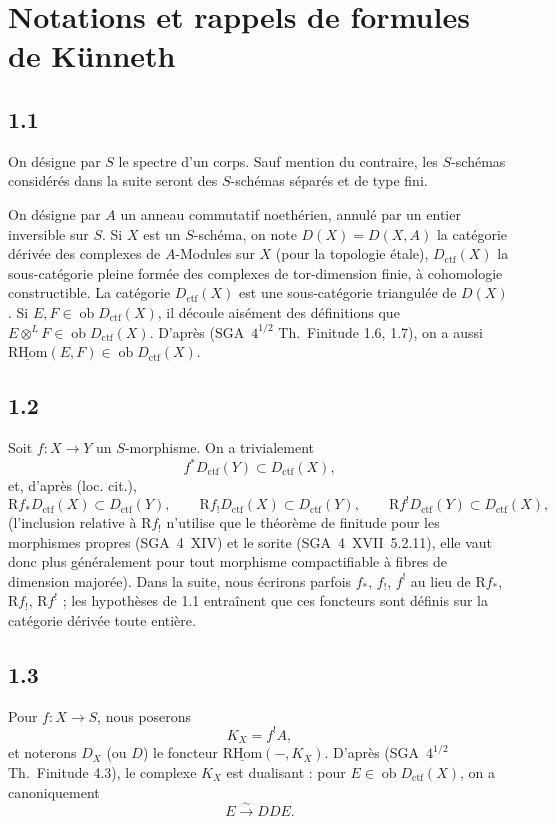 \documentclass[11pt]{article}
\newcommand{\R}{\mathrm{R}}\newcommand{\RHomCore}{\mathrm{RHom}}
\newcommand{\ob}{\operatorname{ob}}
\providecommand{\RHom}{\RHomCore}
\providecommand{\uRHom}{\underline{\RHom}}
\providecommand{\ctf}{\mathrm{ctf}}
\providecommand{\RHom}{\RHomCore}
\providecommand{\ob}{\operatorname{ob}}
\providecommand{\RHom}{\R\mathcal{H}om}
\providecommand{\R}{\mathrm R}
\providecommand{\RHom}{\RHomCore}
\begin{document}
\section{Notations et rappels de formules de Künneth}

\subsection*{1.1}
On désigne par $S$ le spectre d'un corps. Sauf mention du contraire, les $S$-schémas considérés dans la suite seront des $S$-schémas séparés et de type fini.

On désigne par $A$ un anneau commutatif noethérien, annulé par un entier inversible sur $S$. Si $X$ est un $S$-schéma, on note $D(X)=D(X,A)$ la catégorie dérivée des complexes de $A$-Modules sur $X$ (pour la topologie étale), $D_{\ctf}(X)$ la sous-catégorie pleine formée des complexes de tor-dimension finie, à cohomologie constructible. La catégorie $D_{\ctf}(X)$ est une sous-catégorie triangulée de $D(X)$. Si $E,F \in \ob D_{\ctf}(X)$, il découle aisément des définitions que $E \otimes^{L} F \in \ob D_{\ctf}(X)$. D'après (SGA~$4^{1/2}$ Th.~Finitude 1.6, 1.7), on a aussi $\uRHom(E,F) \in \ob D_{\ctf}(X)$.

\subsection*{1.2}
Soit $f:X\to Y$ un $S$-morphisme. On a trivialement
\[
f^{*}D_{\ctf}(Y) \subset D_{\ctf}(X),
\]
et, d'après (loc. cit.),
\[
\R f_{*}D_{\ctf}(X) \subset D_{\ctf}(Y),\qquad
\R f_{!}D_{\ctf}(X) \subset D_{\ctf}(Y),\qquad
\R f^{!}D_{\ctf}(Y) \subset D_{\ctf}(X),
\]
(l'inclusion relative à $\R f_{!}$ n'utilise que le théorème de finitude pour les morphismes propres (SGA~4~XIV) et le sorite (SGA~4~XVII~5.2.11), elle vaut donc plus généralement pour tout morphisme compactifiable à fibres de dimension majorée). Dans la suite, nous écrirons parfois $f_{*}$, $f_{!}$, $f^{!}$ au lieu de $\R f_{*}$, $\R f_{!}$, $\R f^{!}$ ; les hypothèses de 1.1 entraînent que ces foncteurs sont définis sur la catégorie dérivée toute entière.

\subsection*{1.3}
Pour $f:X\to S$, nous poserons
\[
K_X=f^{!}A,
\]
et noterons $D_X$ (ou $D$) le foncteur $\uRHom(-,K_X)$. D'après (SGA~$4^{1/2}$ Th.~Finitude 4.3), le complexe $K_X$ est dualisant : pour $E\in\ob D_{\ctf}(X)$, on a canoniquement
\[
E \xrightarrow{\sim} DDE.
\]
\end{document}
